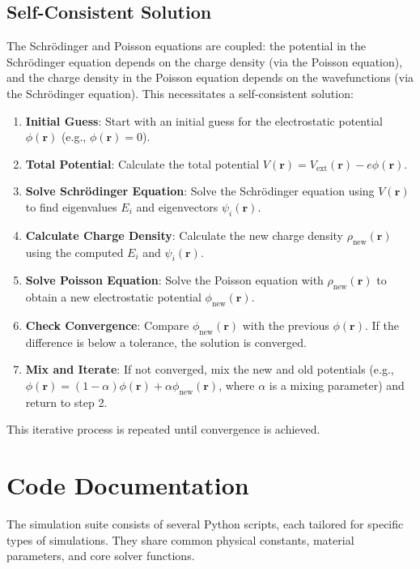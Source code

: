 \documentclass{article}
\begin{document}
\subsection{Self-Consistent Solution}
The Schrödinger and Poisson equations are coupled: the potential in the Schrödinger equation depends on the charge density (via the Poisson equation), and the charge density in the Poisson equation depends on the wavefunctions (via the Schrödinger equation). This necessitates a self-consistent solution:
\begin{enumerate}
    \item \textbf{Initial Guess}: Start with an initial guess for the electrostatic potential $\phi(\mathbf{r})$ (e.g., $\phi(\mathbf{r}) = 0$).
    \item \textbf{Total Potential}: Calculate the total potential $V(\mathbf{r}) = V_{\text{ext}}(\mathbf{r}) - e \phi(\mathbf{r})$.
    \item \textbf{Solve Schrödinger Equation}: Solve the Schrödinger equation using $V(\mathbf{r})$ to find eigenvalues $E_i$ and eigenvectors $\psi_i(\mathbf{r})$.
    \item \textbf{Calculate Charge Density}: Calculate the new charge density $\rho_{\text{new}}(\mathbf{r})$ using the computed $E_i$ and $\psi_i(\mathbf{r})$.
    \item \textbf{Solve Poisson Equation}: Solve the Poisson equation with $\rho_{\text{new}}(\mathbf{r})$ to obtain a new electrostatic potential $\phi_{\text{new}}(\mathbf{r})$.
    \item \textbf{Check Convergence}: Compare $\phi_{\text{new}}(\mathbf{r})$ with the previous $\phi(\mathbf{r})$. If the difference is below a tolerance, the solution is converged.
    \item \textbf{Mix and Iterate}: If not converged, mix the new and old potentials (e.g., $\phi(\mathbf{r}) = (1-\alpha)\phi(\mathbf{r}) + \alpha\phi_{\text{new}}(\mathbf{r})$, where $\alpha$ is a mixing parameter) and return to step 2.
\end{enumerate}
This iterative process is repeated until convergence is achieved.

\section{Code Documentation}
The simulation suite consists of several Python scripts, each tailored for specific types of simulations. They share common physical constants, material parameters, and core solver functions.
\end{document}
